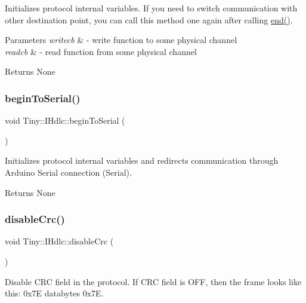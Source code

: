 Initializes protocol internal variables. If you need to switch communication with other destination point, you can call this method one again after calling \hyperlink{classTiny_1_1IHdlc_aba569c97764fdd95e6f140ef51ea83f8}{end()}. 
\begin{DoxyParams}{Parameters}
{\em writecb} & -\/ write function to some physical channel \\
\hline
{\em readcb} & -\/ read function from some physical channel \\
\hline
\end{DoxyParams}
\begin{DoxyReturn}{Returns}
None 
\end{DoxyReturn}
\mbox{\label{classTiny_1_1IHdlc_a549747579cf72e8809b2939104d42667}} 
\subsubsection{\texorpdfstring{begin\+To\+Serial()}{beginToSerial()}}
{\footnotesize\ttfamily void Tiny\+::\+I\+Hdlc\+::begin\+To\+Serial (\begin{DoxyParamCaption}{ }\end{DoxyParamCaption})}

Initializes protocol internal variables and redirects communication through Arduino Serial connection (Serial). \begin{DoxyReturn}{Returns}
None 
\end{DoxyReturn}
\mbox{\label{classTiny_1_1IHdlc_aa96fa5be8ae3ee108258a4f0a6c14cba}} 
\subsubsection{\texorpdfstring{disable\+Crc()}{disableCrc()}}
{\footnotesize\ttfamily void Tiny\+::\+I\+Hdlc\+::disable\+Crc (\begin{DoxyParamCaption}{ }\end{DoxyParamCaption})}

Disable C\+RC field in the protocol. If C\+RC field is O\+FF, then the frame looks like this\+: 0x7E databytes 0x7E. \mbox{\label{classTiny_1_1IHdlc_abb55ff8f38be7541b9b2bb4832c7ecda}} 

